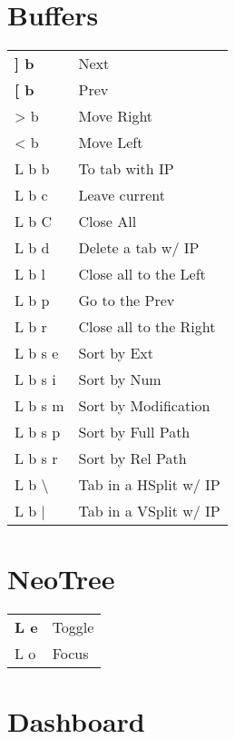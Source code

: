 \documentclass[
  ,landscape
  ,columns=4
]{cheatsheet}
\begin{document}
\section{Buffers}

\begin{tabular}{ll}
	\textbf{{]} b}     & Next                   \\
	\textbf{{[} b}     & Prev                   \\
	> b                & Move Right             \\
	< b                & Move Left              \\
	L b b              & To tab with IP         \\
	L b c              & Leave current          \\
	L b C              & Close All              \\
	L b d              & Delete a tab w/ IP     \\
	L b l              & Close all to the Left  \\
	L b p              & Go to the Prev         \\
	L b r              & Close all to the Right \\
	L b s e            & Sort by Ext            \\
	L b s i            & Sort by Num            \\
	L b s m            & Sort by Modification   \\
	L b s p            & Sort by Full Path      \\
	L b s r            & Sort by Rel Path       \\
	L b \textbackslash & Tab in a HSplit w/ IP  \\
	L b {|}            & Tab in a VSplit w/ IP  \\
\end{tabular}

\section{NeoTree}

\begin{tabular}{ll}
	\textbf{L e} & Toggle \\
	L o          & Focus  \\
\end{tabular}

\section{Dashboard}
\end{document}
